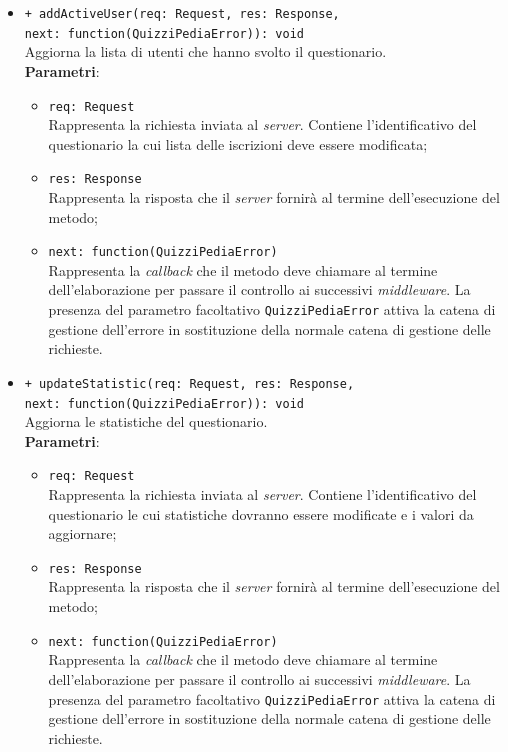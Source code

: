 \begin{itemize}
\begin{itemize}
		\item \texttt{+ addActiveUser(req: Request, res: Response, \\next: function(QuizziPediaError)): void}\\
		Aggiorna la lista di utenti che hanno svolto il questionario.\\
		\textbf{Parametri}:
		\begin{itemize}
			\item \texttt{req: Request}\\
			Rappresenta la richiesta inviata al \textit{server}. Contiene l'identificativo del questionario la cui lista delle iscrizioni deve essere modificata;
			\item \texttt{res: Response}\\
			Rappresenta la risposta che il \textit{server} fornirà al termine dell'esecuzione del metodo;
			\item \texttt{next: function(QuizziPediaError)}\\
			Rappresenta la \textit{callback} che il metodo deve chiamare al termine dell'elaborazione per passare il controllo ai successivi \textit{middleware}. La presenza del parametro facoltativo \texttt{QuizziPediaError} attiva la catena di gestione dell'errore in sostituzione della normale catena di gestione delle richieste.
		\end{itemize}
		
		\item \texttt{+ updateStatistic(req: Request, res: Response, \\next: function(QuizziPediaError)): void}\\
		Aggiorna le statistiche del questionario.\\
		\textbf{Parametri}:
		\begin{itemize}
			\item \texttt{req: Request}\\
			Rappresenta la richiesta inviata al \textit{server}. Contiene l'identificativo del questionario le cui statistiche dovranno essere modificate e i valori da aggiornare;
			\item \texttt{res: Response}\\
			Rappresenta la risposta che il \textit{server} fornirà al termine dell'esecuzione del metodo;
			\item \texttt{next: function(QuizziPediaError)}\\
			Rappresenta la \textit{callback} che il metodo deve chiamare al termine dell'elaborazione per passare il controllo ai successivi \textit{middleware}. La presenza del parametro facoltativo \texttt{QuizziPediaError} attiva la catena di gestione dell'errore in sostituzione della normale catena di gestione delle richieste.
		\end{itemize}
		

\end{itemize}
\end{itemize}
